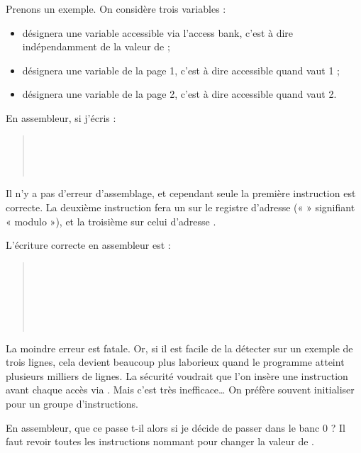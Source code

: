 Prenons un exemple. On considère trois variables :
\begin{itemize}
  \item {} désignera une variable accessible via l’access bank, c’est à dire indépendamment de la valeur de  ;
  \item {} désignera une variable de la page 1, c’est à dire accessible quand  vaut 1 ;
  \item {} désignera une variable de la page 2, c’est à dire accessible quand  vaut 2.
\end{itemize}

En assembleur, si j’écris :
\begin{quote}
\\
\\
\\
\end{quote}

Il n’y a pas d’erreur d’assemblage, et cependant seule la première instruction est correcte. La deuxième instruction fera un  sur le registre d’adresse  (« \assembleur{\%} » signifiant « modulo »), et la troisième sur celui d’adresse .

L’écriture correcte en assembleur est :
\begin{quote}
\\
\\
\\
\\
\\
\end{quote}

La moindre erreur est fatale. Or, si il est facile de la détecter sur un exemple de trois lignes, cela devient beaucoup plus laborieux quand le programme atteint plusieurs milliers de lignes. La sécurité voudrait que l’on insère une instruction  avant chaque accès via . Mais c’est très inefficace… On préfère souvent initialiser  pour un groupe d’instructions.

En assembleur, que ce passe t-il alors si je décide de passer  dans le banc 0 ? Il faut revoir toutes les instructions nommant  pour changer la valeur de . 

